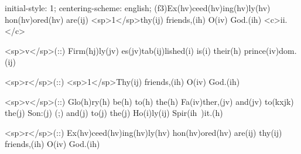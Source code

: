 initial-style: 1;
centering-scheme: english;
(f3)Ex(hv)ceed(hv)ing(hv)ly(hv) hon(hv)ored(hv) are(ij) <sp>1</sp>thy(ij) friends,(ih) O(iv) God.(ih) <c>ii.</c>

<sp>v</sp>(::) Firm(hj)ly(jv) es(jv)tab(ij)lished(i) is(i) their(h) prince(iv)dom.(ij)

<sp>r</sp>(::) <sp>1</sp>Thy(ij) friends,(ih) O(iv) God.(ih)

<sp>v</sp>(::) Glo(h)ry(h) be(h) to(h) the(h) Fa(iv)ther,(jv) and(jv) to(kxjk) the(j) Son:(j) (;) and(j) to(j) the(j) Ho(i)ly(ij) Spir(ih~)it.(h)

<sp>r</sp>(::) Ex(hv)ceed(hv)ing(hv)ly(hv) hon(hv)ored(hv) are(ij) thy(ij) friends,(ih) O(iv) God.(ih)
